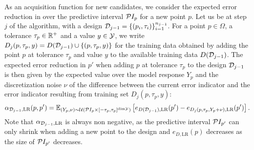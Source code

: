 As an acquisition function for new candidates, we consider the expected error reduction in over the predictive interval $\mathcal PI_{p}$ for a new point $p$. \newline
Let us be at step $j$ of the algorithm, with a design $\mathcal D_{j-1} = \{ (p_i, \tau_i) \}_{i=1}^{n_{j-1}}$.
For a point $p \in \Omega$, a tolerance $\tau_p\in \mathbb{R}^+$ and a value $y\in \mathcal Y$, we write $D_j(p,\tau_p, y) = D(\mathcal D_{j-1} ) \cup \{(p, \tau_p, y)\}$ for the training data obtained by adding the point $p$ at tolerance $\tau_p$ and value $y$ to the available training data $D(\mathcal D_{j-1})$. \newline
The expected error reduction in $p'$ when adding $p$ at tolerance $\tau_p$ to the design $\mathcal D_{j-1}$ is then given by the expected value over the model response $Y_p$ and the discretization noise $\nu$ of the difference between the current error indicator and the error indicator resulting from training set $D_j(p,\tau_p, y)$:
\begin{equation}\label{eq:alpha-LR-general}
    \alpha_{\mathcal D_{j-1}, \text{LR}}(p, p') = 
    \mathbb E _{ (Y_p, \nu) \sim \mathcal U\left( \mathcal PI_p \times  [-\tau_p, \tau_p] ^{ \text{dim} \mathcal Y } \right)} 
    \left[ 
        e_{D(\mathcal D_{j-1}), \text{LR}}(p')- e_{D_j(p,\tau_p, Y_p + \nu ), \text{LR}}(p')
    \right].
\end{equation}
Note that $\alpha_{\mathcal D_{j-1}, \text{LR}}$ is always non negative, as the predictive interval $\mathcal PI_{p'}$ can only shrink when adding a new point to the design and $e_{D, \text{LR}}(p)$ decreases as the size of $\mathcal PI_{p'}$ decreases. \medbreak

